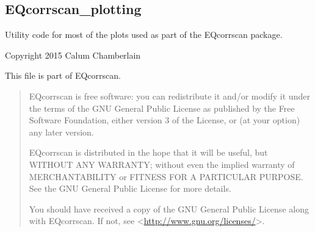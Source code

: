 \documentclass[a4paper,10pt,english]{sphinxmanual}
\begin{document}
\subsection{EQcorrscan\_plotting}
\label{utils:module-EQcorrscan_plotting}\label{utils:eqcorrscan-plotting}
Utility code for most of the plots used as part of the EQcorrscan package.

Copyright 2015 Calum Chamberlain

This file is part of EQcorrscan.
\begin{quote}

EQcorrscan is free software: you can redistribute it and/or modify
it under the terms of the GNU General Public License as published by
the Free Software Foundation, either version 3 of the License, or
(at your option) any later version.

EQcorrscan is distributed in the hope that it will be useful,
but WITHOUT ANY WARRANTY; without even the implied warranty of
MERCHANTABILITY or FITNESS FOR A PARTICULAR PURPOSE.  See the
GNU General Public License for more details.

You should have received a copy of the GNU General Public License
along with EQcorrscan.  If not, see \textless{}\href{http://www.gnu.org/licenses/}{http://www.gnu.org/licenses/}\textgreater{}.
\end{quote}
\end{document}
